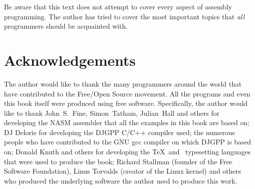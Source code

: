 Be aware that this text does not attempt to cover every aspect of assembly
programming. The author has tried to cover the most important topics that
\emph{all} programmers should be acquainted with.

\section*{Acknowledgements}

The author would like to thank the many programmers around the world
that have contributed to the Free/Open Source movement. All the
programs and even this book itself were produced using free
software. Specifically, the author would like to thank John~S.~Fine,
Simon~Tatham, Julian~Hall and others for developing the NASM assembler
that all the examples in this book are based on; DJ Delorie for
developing the DJGPP C/C++ compiler used; the numerous people who have
contributed to the GNU gcc compiler on which DJGPP is based on; Donald
Knuth and others for developing the \TeX\ and \LaTeXe\ typesetting
languages that were used to produce the book; Richard Stallman
(founder of the Free Software Foundation), Linus Torvalds (creator of
the Linux kernel) and others who produced the underlying software the
author used to produce this work.


